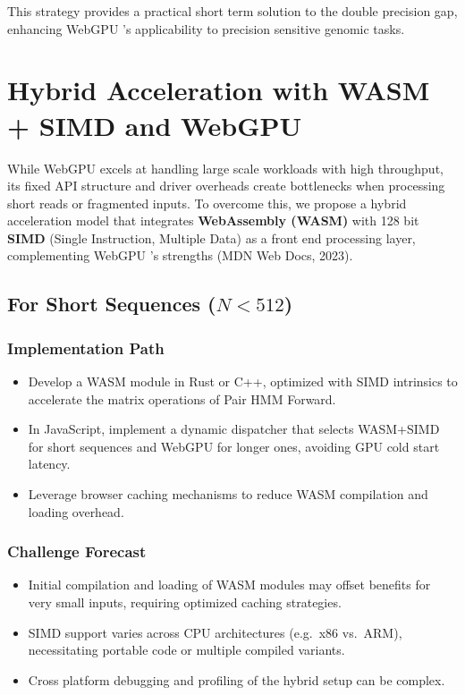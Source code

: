 \documentclass[PhD]{PHlab-thesis}
\begin{document}
This strategy provides a practical short term solution to the double precision gap, enhancing WebGPU 's applicability to precision sensitive genomic tasks.

\section{Hybrid Acceleration with WASM + SIMD and WebGPU}

While WebGPU excels at handling large scale workloads with high throughput, its fixed API structure and driver overheads create bottlenecks when processing short reads or fragmented inputs. To overcome this, we propose a hybrid acceleration model that integrates \textbf{WebAssembly (WASM)} with 128 bit \textbf{SIMD} (Single Instruction, Multiple Data) as a front end processing layer, complementing WebGPU 's strengths (MDN Web Docs, 2023).

\subsection{For Short Sequences (\(N < 512\))}

\subsubsection*{Implementation Path}
\begin{itemize}
  \item Develop a WASM module in Rust or C++, optimized with SIMD intrinsics to accelerate the matrix operations of Pair HMM Forward.
  \item In JavaScript, implement a dynamic dispatcher that selects WASM+SIMD for short sequences and WebGPU for longer ones, avoiding GPU cold start latency.
  \item Leverage browser caching mechanisms to reduce WASM compilation and loading overhead.
\end{itemize}

\subsubsection*{Challenge Forecast}
\begin{itemize}
  \item Initial compilation and loading of WASM modules may offset benefits for very small inputs, requiring optimized caching strategies.
  \item SIMD support varies across CPU architectures (e.g.\ x86 vs.\ ARM), necessitating portable code or multiple compiled variants.
  \item Cross platform debugging and profiling of the hybrid setup can be complex.
\end{itemize}
\end{document}

